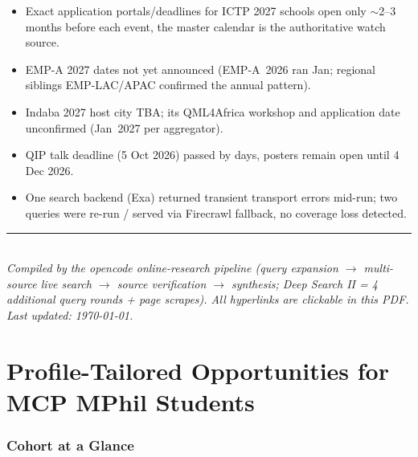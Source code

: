 \documentclass[11pt,a4paper]{article}
\begin{document}
\begin{itemize}[leftmargin=1.4em]
  \item Exact application portals/deadlines for ICTP 2027 schools open only $\sim$2--3 months before each event, the master calendar is the authoritative watch source.
  \item EMP-A 2027 dates not yet announced (EMP-A~2026 ran Jan; regional siblings EMP-LAC/APAC confirmed the annual pattern).
  \item Indaba 2027 host city TBA; its QML4Africa workshop and application date unconfirmed (Jan~2027 per aggregator).
  \item QIP talk deadline (5 Oct 2026) passed by days, posters remain open until 4 Dec 2026.
  \item One search backend (Exa) returned transient transport errors mid-run; two queries were re-run / served via Firecrawl fallback, no coverage loss detected.
\end{itemize}

\bigskip
\noindent\rule{\textwidth}{0.4pt}\\
\small\emph{Compiled by the opencode online-research pipeline (query expansion $\rightarrow$ multi-source live search $\rightarrow$ source verification $\rightarrow$ synthesis; Deep Search II = 4 additional query rounds + page scrapes). All hyperlinks are clickable in this PDF. Last updated: \today.}



\newpage
\part{Profile-Tailored Opportunities for MCP MPhil Students}

\noindent{}

\section{Cohort at a Glance}
\end{document}
